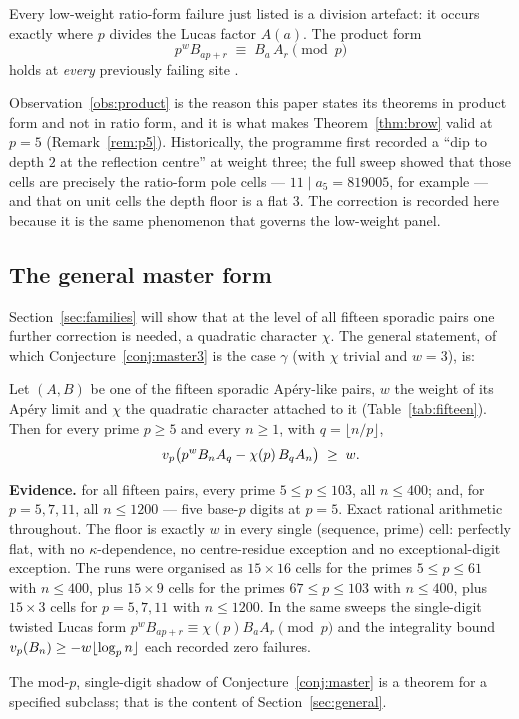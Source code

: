 \begin{observation}\label{obs:product}
Every low-weight ratio-form failure just listed is a division artefact: it occurs exactly
where $p$ divides the Lucas factor $A(a)$. The product form
\[
   p^{w}B_{ap+r}\;\equiv\;B_a\,A_r\pmod p
\]
holds at \emph{every} previously failing site .
\end{observation}

Observation~\ref{obs:product} is the reason this paper states its theorems in product form
and not in ratio form, and it is what makes Theorem~\ref{thm:brow} valid at $p=5$
(Remark~\ref{rem:p5}). Historically, the programme first recorded a ``dip to depth $2$ at
the reflection centre'' at weight three; the full sweep showed that those cells are
precisely the ratio-form pole cells --- $11\mid a_5=819005$, for example --- and that on
unit cells the depth floor is a flat $3$. The correction is recorded here because it is
the same phenomenon that governs the low-weight panel.

\subsection{The general master form}

Section~\ref{sec:families} will show that at the level of all fifteen sporadic pairs one
further correction is needed, a quadratic character $\chi$. The general statement, of
which Conjecture~\ref{conj:master3} is the case $\gamma$ (with $\chi$ trivial and $w=3$),
is:

\begin{conjecture}\label{conj:master}
Let $(A,B)$ be one of the fifteen sporadic Ap\'ery-like pairs, $w$ the weight of its
Ap\'ery limit and $\chi$ the quadratic character attached to it
(Table~\ref{tab:fifteen}). Then for every prime $p\ge5$ and every $n\ge1$, with
$q=\lfloor n/p\rfloor$,
\[
   v_p\bigl(p^{w}B_nA_q-\chi(p)\,B_qA_n\bigr)\;\ge\;w .
\]
\end{conjecture}

\noindent\textbf{Evidence.}  for all fifteen pairs, every prime
$5\le p\le103$, all $n\le400$; and, for $p=5,7,11$, all $n\le1200$ --- five base-$p$
digits at $p=5$. Exact rational arithmetic throughout. The floor is exactly $w$ in every
single (sequence, prime) cell: perfectly flat, with no $\kappa$-dependence, no
centre-residue exception and no exceptional-digit exception. The runs were organised as
$15\times16$ cells for the primes $5\le p\le61$ with $n\le400$, plus $15\times9$ cells for
the primes $67\le p\le103$ with $n\le400$, plus $15\times3$ cells for $p=5,7,11$ with
$n\le1200$. In the same sweeps the single-digit twisted Lucas form
$p^wB_{ap+r}\equiv\chi(p)B_aA_r\pmod p$ and the integrality bound
$v_p(B_n)\ge-w\lfloor\log_pn\rfloor$ each recorded zero failures.

The mod-$p$, single-digit shadow of Conjecture~\ref{conj:master} is a theorem for a
specified subclass; that is the content of Section~\ref{sec:general}.
